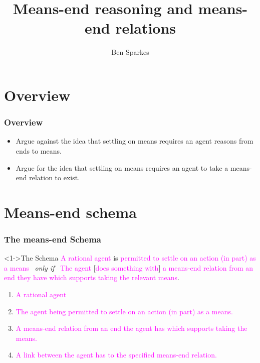 \documentclass[noamssymb,
]{beamer} %
\title{Means-end reasoning and means-end relations}
\author{Ben Sparkes}
\begin{document}
\begin{frame}[noframenumbering]
  \titlepage
\end{frame}


\section*{Overview}
\label{sec:overview}

\begin{frame}
  \frametitle{Overview}

  \begin{itemize}
  \item Argue against the idea that settling on means requires an agent reasons from ends to means.
  \item Argue for the idea that settling on means requires an agent to take a means-end relation to exist.
  \end{itemize}
\end{frame}


\section{Means-end schema}
\label{sec:schema}

\begin{frame}
  \frametitle{The means-end Schema}

  \begin{block}<1->{The Schema}
    \textcolor<3>{fuchsia}{A rational agent} is \textcolor<4>{fuchsia}{permitted to settle on an action (in part) as a means}
    \newline
    \mbox{ }\hfill\emph{only if}\hfill\mbox{ }
    \newline
    \textcolor<3>{fuchsia}{The agent} [\textcolor<6>{fuchsia}{does something with}] \textcolor<5>{fuchsia}{a means-end relation from an end they have which supports taking the relevant means}.
  \end{block}

  \begin{enumerate}%
  \item<3-6> \textcolor<3>{fuchsia}{A rational agent}
  \item<4-6> \textcolor<4>{fuchsia}{The agent being permitted to settle on an action (in part) as a means.}
  \item<5-6> \textcolor<5>{fuchsia}{A means-end relation from an end the agent has which supports taking the means.}
  \item<6-6> \textcolor<6>{fuchsia}{A link between the agent has to the specified means-end relation.}
  \end{enumerate}
\end{frame}
\end{document}
